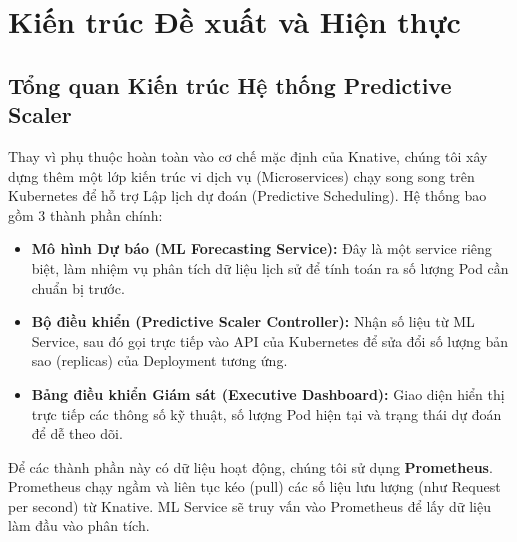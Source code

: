 \section{Kiến trúc Đề xuất và Hiện thực}

\subsection{Tổng quan Kiến trúc Hệ thống Predictive Scaler}
Thay vì phụ thuộc hoàn toàn vào cơ chế mặc định của Knative, chúng tôi xây dựng thêm một lớp kiến trúc vi dịch vụ (Microservices) chạy song song trên Kubernetes để hỗ trợ Lập lịch dự đoán (Predictive Scheduling). Hệ thống bao gồm 3 thành phần chính:

\begin{itemize}
    \item \textbf{Mô hình Dự báo (ML Forecasting Service):} Đây là một service riêng biệt, làm nhiệm vụ phân tích dữ liệu lịch sử để tính toán ra số lượng Pod cần chuẩn bị trước.
    \item \textbf{Bộ điều khiển (Predictive Scaler Controller):} Nhận số liệu từ ML Service, sau đó gọi trực tiếp vào API của Kubernetes để sửa đổi số lượng bản sao (replicas) của Deployment tương ứng.
    \item \textbf{Bảng điều khiển Giám sát (Executive Dashboard):} Giao diện hiển thị trực tiếp các thông số kỹ thuật, số lượng Pod hiện tại và trạng thái dự đoán để dễ theo dõi.
\end{itemize}

Để các thành phần này có dữ liệu hoạt động, chúng tôi sử dụng \textbf{Prometheus}. Prometheus chạy ngầm và liên tục kéo (pull) các số liệu lưu lượng (như Request per second) từ Knative. ML Service sẽ truy vấn vào Prometheus để lấy dữ liệu làm đầu vào phân tích.

